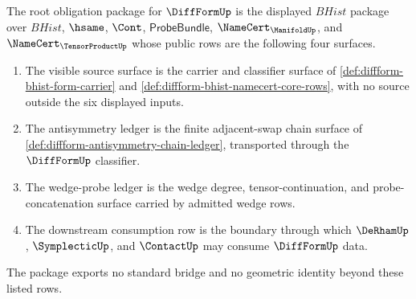 \begin{definition}
\label{def:diffform-root-obligation-package}
The root obligation package for $\DiffFormUp$ is the displayed
$BHist$ package over $BHist$, $\hsame$, $\Cont$,
$\mathsf{ProbeBundle}$, $\NameCert_{\ManifoldUp}$, and
$\NameCert_{\TensorProductUp}$ whose public rows are the following four
surfaces.
\begin{enumerate}
\item The visible source surface is the carrier and classifier surface of
\autoref{def:diffform-bhist-form-carrier} and
\autoref{def:diffform-bhist-namecert-core-rows}, with no source outside the
six displayed inputs.
\item The antisymmetry ledger is the finite adjacent-swap chain surface of
\autoref{def:diffform-antisymmetry-chain-ledger}, transported through the
$\DiffFormUp$ classifier.
\item The wedge-probe ledger is the wedge degree, tensor-continuation, and
probe-concatenation surface carried by admitted wedge rows.
\item The downstream consumption row is the boundary through which
$\DeRhamUp$, $\SymplecticUp$, and $\ContactUp$ may consume $\DiffFormUp$ data.
\end{enumerate}
The package exports no standard bridge and no geometric identity beyond these
listed rows.
\end{definition}

